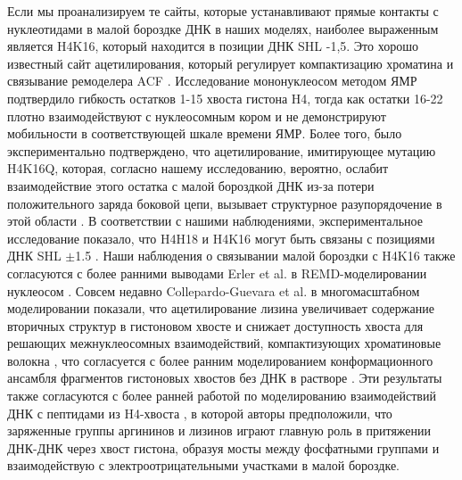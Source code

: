     Если мы проанализируем те сайты, которые устанавливают прямые контакты с нуклеотидами в малой бороздке ДНК в наших моделях, наиболее выраженным является H4K16, который находится в позиции ДНК SHL -1,5. Это хорошо известный сайт ацетилирования, который регулирует компактизацию хроматина и связывание ремоделера ACF \cite{shogren-knaak_histone_2006}. Исследование мононуклеосом методом ЯМР подтвердило гибкость остатков 1-15 хвоста гистона H4, тогда как остатки 16-22 плотно взаимодействуют с нуклеосомным кором и не демонстрируют мобильности в соответствующей шкале времени ЯМР. Более того, было экспериментально подтверждено, что ацетилирование, имитирующее мутацию H4K16Q, которая, согласно нашему исследованию, вероятно, ослабит взаимодействие этого остатка с малой бороздкой ДНК из-за потери положительного заряда боковой цепи, вызывает структурное разупорядочение в этой области \cite{zhou_histone_2012}. В соответствии с нашими наблюдениями, экспериментальное исследование показало, что H4H18 и H4K16 могут быть связаны с позициями ДНК SHL $\pm$1.5 \cite{weng_probing_2014}. Наши наблюдения о связывании малой бороздки с H4K16 также согласуются с более ранними выводами Erler et al. в REMD-моделировании нуклеосом \cite{erler_role_2014}. Совсем недавно Collepardo-Guevara et al. в многомасштабном моделировании показали, что ацетилирование лизина увеличивает содержание вторичных структур в гистоновом хвосте и снижает доступность хвоста для решающих межнуклеосомных взаимодействий, компактизующих хроматиновые волокна \cite{collepardo-guevara_chromatin_2015}, что согласуется с более ранним моделированием конформационного ансамбля фрагментов гистоновых хвостов без ДНК в растворе \cite{potoyan_energy_2011,potoyan_regulation_2012}. Эти результаты также согласуются с более ранней работой по моделированию взаимодействий ДНК с пептидами из H4-хвоста \cite{korolev_h4_2007,korolev_molecular_2014}, в которой авторы предположили, что заряженные группы аргининов и лизинов играют главную роль в притяжении ДНК-ДНК через хвост гистона, образуя мосты между фосфатными группами и взаимодействую с электроотрицательными участками в малой бороздке.

